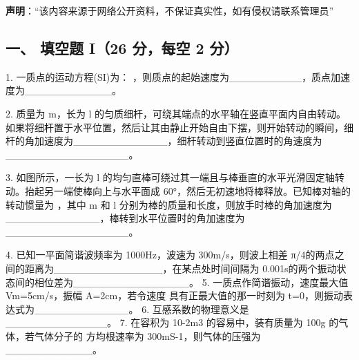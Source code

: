 
\textbf{声明}：“该内容来源于网络公开资料，不保证真实性，如有侵权请联系管理员”

\subsection{一、 填空题 I（26 分，每空 2 分）}
1. 一质点的运动方程(SI)为： ，则质点的起始速度为__________，质点加速度为____________。

2. 质量为 m，长为 l 的匀质细杆，可绕其端点的水平轴在竖直平面内自由转动。如果将细杆置于水平位置，然后让其由静止开始自由下摆，则开始转动的瞬间，细杆的角加速度为_____________，细杆转动到竖直位置时的角速度为_________________。

3. 如图所示，一长为 l 的均匀直棒可绕过其一端且与棒垂直的水平光滑固定轴转动。抬起另一端使棒向上与水平面成 60°，然后无初速地将棒释放。已知棒对轴的转动惯量为 ，其中 m 和 l 分别为棒的质量和长度，则放手时棒的角加速度为_____________，棒转到水平位置时的角加速度为_________________。

4. 已知一平面简谐波频率为 1000Hz，波速为 300m/s，则波上相差 π/4的两点之间的距离为_______________，在某点处时间间隔为 0.001s的两个振动状态间的相位差为________________。
5. 一质点作简谐振动，速度最大值 Vm=5cm/s，振幅 A=2cm，若令速度
具有正最大值的那一时刻为 t=0，则振动表达式为_____________。
6. 互感系数的物理意义是______________。
7. 在容积为 10-2m3 的容易中，装有质量为 100g 的气体，若气体分子的
方均根速率为 300mS-1，则气体的压强为____________。